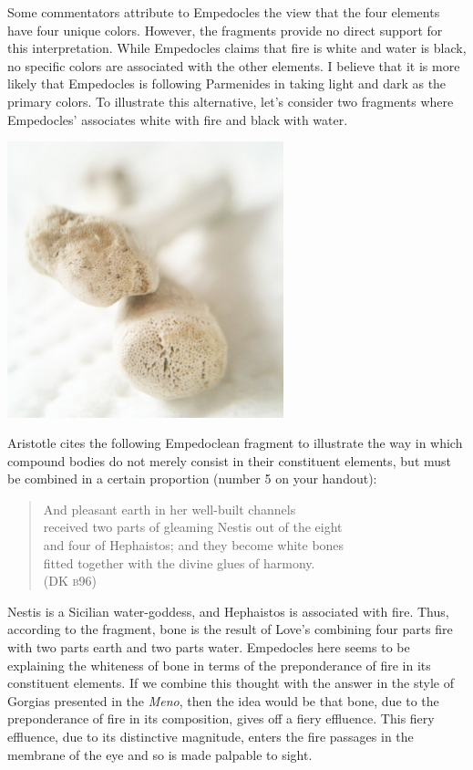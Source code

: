 Some commentators attribute to Empedocles the view that the four elements have four unique colors. However, the fragments provide no direct support for this interpretation. While Empedocles claims that fire is white and water is black, no specific colors are associated with the other elements. I believe that it is more likely that Empedocles is following Parmenides in taking light and dark as the primary colors. To illustrate this alternative, let's consider two fragments where Empedocles' associates white with fire and black with water. \change

\begin{frame}
	\begin{center}
		\includegraphics[height=8cm]{../../graphics/bone.jpg}
	\end{center}
\end{frame}

Aristotle cites the following Empedoclean fragment to illustrate the way in which compound bodies do not merely consist in their constituent elements, but must be combined in a certain proportion (number 5 on your handout):
\begin{verse}
    And pleasant earth in her well-built channels\\
    received two parts of gleaming Nestis out of the eight\\
    and four of Hephaistos; and they become white bones\\
    fitted together with the divine glues of harmony.\\
    (DK \textsc{b}96)
\end{verse}
Nestis is a Sicilian water-goddess, and Hephaistos is associated with fire. Thus, according to the fragment, bone is the result of Love's combining four parts fire with two parts earth and two parts water. Empedocles here seems to be explaining the whiteness of bone in terms of the preponderance of fire in its constituent elements. If we combine this thought with the answer in the style of Gorgias presented in the \emph{Meno}, then the idea would be that bone, due to the preponderance of fire in its composition, gives off a fiery effluence. This fiery effluence, due to its distinctive magnitude, enters the fire passages in the membrane of the eye and so is made palpable to sight. \change

